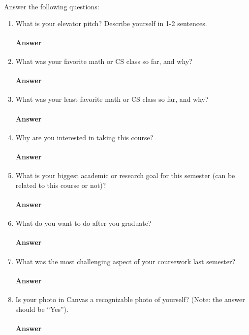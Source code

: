 \documentclass{article}
\begin{document}
Answer the following questions:
\begin{enumerate}
    \item What is your elevator pitch?  Describe yourself in 1-2
                sentences.

        \paragraph{Answer} \todo{}

     \item What was your favorite math or CS class so far, and why?

         \paragraph{Answer} \todo{}

     \item What was your least favorite math or CS class so far, and why?

         \paragraph{Answer} \todo{}

     \item Why are you interested in taking this course?

         \paragraph{Answer} \todo{}

     \item What is your biggest academic or research goal for this semester (can
         be related to this course or not)?

         \paragraph{Answer} \todo{}

     \item What do you want to do after you graduate?

         \paragraph{Answer} \todo{}

     \item What was the most challenging aspect of your coursework last semester?

         \paragraph{Answer} \todo{}

    \item Is your photo in Canvas a recognizable photo of yourself?  (Note: the
        answer should be ``Yes'').

         \paragraph{Answer} \todo{}

\end{enumerate}
\end{document}
